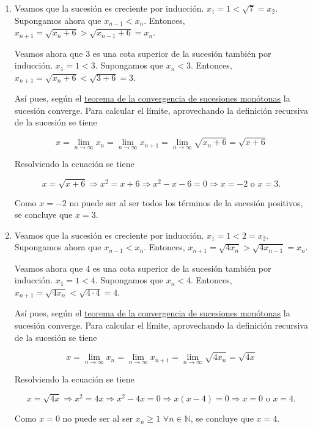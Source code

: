 \documentclass[
  spanish,
  a4paper,
]{scrreport}
\theoremstyle{definition}
\theoremstyle{remark}
\begin{document}
\begin{tcolorbox}
\begin{enumerate}
  Sin embargo, la sucesión no está acotada, ya que para cualquier
  \(c\in\mathbb{R}\), por la propiedad arquimediana existe
  \(n\in\mathbb{N}\) tal que \(c<n<\frac{n^2}{2n+1}=x_n\) si \(n>2\).
  Por tanto, según el el
  \href{https://aprendeconalf.es/analisis-manual/sucesiones.html\#thm-convergencia-monotona}{teorema
  de la convergencia de sucesiones monótonas} la sucesión diverge.
\item
  Veamos que la sucesión es creciente por inducción.
  \(x_1=1<\sqrt{7}=x_2\). Supongamos ahora que \(x_{n-1}<x_n\).
  Entonces, \(x_{n+1} = \sqrt{x_n+6} > \sqrt{x_{n-1}+6} = x_n\).

  Veamos ahora que \(3\) es una cota superior de la sucesión también por
  inducción. \(x_1 = 1 < 3\). Supongamos que \(x_n<3\). Entonces,
  \(x_{n+1}=\sqrt{x_n+6} < \sqrt{3+6} = 3\).

  Así pues, según el
  \href{https://aprendeconalf.es/analisis-manual/sucesiones.html\#thm-convergencia-monotona}{teorema
  de la convergencia de sucesiones monótonas} la sucesión converge. Para
  calcular el límite, aprovechando la definición recursiva de la
  sucesión se tiene

  \[
   x = \lim_{n\to\infty}x_n = \lim_{n\to\infty}x_{n+1} = \lim_{n\to\infty}\sqrt{x_n+6} = \sqrt{x+6}
   \]

  Resolviendo la ecuación se tiene

  \[
   x=\sqrt{x+6} \Rightarrow x^2=x+6 \Rightarrow x^2-x-6=0 \Rightarrow x=-2 \mbox{ o } x=3.
   \]

  Como \(x=-2\) no puede ser al ser todos los términos de la sucesión
  positivos, se concluye que \(x=3\).
\item
  Veamos que la sucesión es creciente por inducción. \(x_1=1<2=x_2\).
  Supongamos ahora que \(x_{n-1}<x_n\). Entonces,
  \(x_{n+1} = \sqrt{4x_n} > \sqrt{4x_{n-1}} = x_n\).

  Veamos ahora que \(4\) es una cota superior de la sucesión también por
  inducción. \(x_1 = 1 < 4\). Supongamos que \(x_n<4\). Entonces,
  \(x_{n+1}=\sqrt{4x_n} < \sqrt{4\cdot 4} = 4\).

  Así pues, según el
  \href{https://aprendeconalf.es/analisis-manual/sucesiones.html\#thm-convergencia-monotona}{teorema
  de la convergencia de sucesiones monótonas} la sucesión converge. Para
  calcular el límite, aprovechando la definición recursiva de la
  sucesión se tiene

  \[
   x = \lim_{n\to\infty}x_n = \lim_{n\to\infty}x_{n+1} = \lim_{n\to\infty}\sqrt{4x_n} = \sqrt{4x}
   \]

  Resolviendo la ecuación se tiene

  \[
   x=\sqrt{4x} \Rightarrow x^2=4x \Rightarrow x^2-4x=0 \Rightarrow x(x-4)=0 \Rightarrow x=0 \mbox{ o } x=4.
   \]

  Como \(x=0\) no puede ser al ser \(x_n\geq 1\)
  \(\forall n\in\mathbb{N}\), se concluye que \(x=4\).
\end{enumerate}

\end{tcolorbox}
\end{document}
